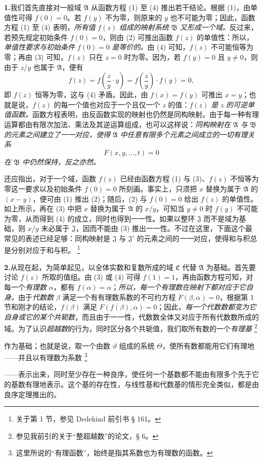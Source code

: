 \documentclass[11pt]{article}
\providecommand{\qtext}[1]{“#1”}
\providecommand{\Afield}{\mathfrak A}
\providecommand{\Bfield}{\mathfrak B}
\providecommand{\Cfield}{\mathfrak C}
\providecommand{\Jdom}{\mathfrak J}
\providecommand{\srcfn}[2]{%
  \begingroup\renewcommand{\thefootnote}{#1}\footnote{#2}\addtocounter{footnote}{-1}\endgroup}
\begin{document}
\medskip
\noindent\textbf{1.}\quad 我们首先直接对一般域 \(\Afield\) 从函数方程 (1) 至 (4) 推出若干结论。根据 (1)，由单值性可得 \(f(0)=0\)。若 \(f(y)\) 不为零，则原来的 \(y\) 也不可能为零；因此，函数方程 (1) 至 (4) 表明，\emph{所有值} \(f(z)\) \emph{组成的映射系统} \(\Bfield\) \emph{又形成一个域。}反过来，若预先规定初始条件 \(f(0)=0\)，则由 (2) 可推出函数 \(f(z)\) 的单值性：所以，\emph{单值性要求与初始条件} \(f(0)=0\) \emph{是等价的。}由 (4) 可知，\(f(z)\) 不可能恒等为零；再由 (3) 可知，\(f(z)\) 只在 \(z=0\) 时为零。因为，若 \(f(y)=0\) 且 \(y\ne0\)，则由于 \(z/y\) 也属于 \(\Afield\)，便有
\[
f(z)=f\!\left(\frac{z}{y}\cdot y\right)=f\!\left(\frac{z}{y}\right)\cdot f(y)=0,
\]
即 \(f(z)\) 恒等为零，这与 (4) 矛盾。因此，由 \(f(x)=f(y)\) 可推出 \(x=y\)；也就是说，\(f(z)\) 的每一个值也对应于一个且仅一个 \(z\) 的值：\emph{\(f(z)\) 是} \(z\) \emph{的可逆单值函数。}函数方程表明，由反函数实现的映射也仍然是同构映射。由于每一种有理运算都由有限次加法、乘法及其逆运算组成，也可以这样说：\emph{同构映射在} \(\Afield\) \emph{与} \(\Bfield\) \emph{的元素之间建立了一一对应，使得} \(\Afield\) \emph{中任意有限多个元素之间成立的一切有理关系}
\[
F(x,y,\ldots,t)=0
\]
\emph{在} \(\Bfield\) \emph{中仍然保持，反之亦然。}

还应指出，对于一个域，函数 \(f(z)\) 已经由函数方程 (1) 与 (3)、\(f(z)\) 不恒等为零这一要求以及初始条件 \(f(0)=0\) 所刻画。事实上，只须把 \(x\) 替换为属于 \(\Afield\) 的 \((x-y)\)，便可由 (1) 推出 (2)；随后，(2) 与 \(f(0)=0\) 给出 \(f(z)\) 的单值性。如上所示，再在 (3) 中把 \(x\) 替换为属于 \(\Afield\) 的 \(x/y\)，可知当 \(y\ne0\) 时 \(f(y)\) 不可能为零，从而得到 (4) 的成立，同时也得到一一性。如果以整环 \(\Jdom\) 而不是域为基础，则 \(x/y\) 未必属于 \(\Jdom\)，因而不能由 (3) 推出一一性。不过在这里，下面这个最常见的表述已经足够：同构映射是 \(\Jdom\) 与 \(\Jdom'\) 的元素之间的\emph{一一}对应，使得和与积总是分别对应于和与积。\srcfn{*)}{关于第 1 节，参见 Dedekind 前引书 § 161。}

\medskip
\noindent\textbf{2.}\quad 从现在起，为简单起见，以全体实数和复数所成的域 \(\Cfield\) 代替 \(\Afield\) 为基础。首先要讨论 \(f(z)\) 所取的值组。由 (3) 或 (4) 可得 \(f(1)=1\)，再由函数方程可知，对每一个\emph{有理数} \(\alpha\)，都有 \(f(\alpha)=\alpha\)；\emph{所以，每一个有理数在映射下都对应于它自身。}由于\emph{代数数} \(\beta\) 满足一个有有理数系数的不可约方程 \(F(\beta,\alpha)=0\)，根据第 1 节和刚才的结论，\(f(\beta)\) 满足 \(F(f(\beta),\alpha)=0\)；因此，\emph{每一个代数数都变为它自身或它的某个共轭数}，而且由于一一性，代数数全体又对应于所有代数数所成的域。为了认识\emph{超越数}的行为，同时区分各个共轭值，我们取所有数的一个\emph{有理基}\srcfn{**)}{参见我前引的关于\qtext{整超越数}的论文，§ 6。}作为基础；也就是说，取一个由数 \(\vartheta\) 组成的系统 \(\Theta\)，使所有数都能用它们有理地——并且以有理数为系数\srcfn{***)}{这里所说的\qtext{有理函数}，始终是指其系数也为有理数的函数。}——表示出来，同时至少存在一种良序，使任何一个基数都不能由有限多个先于它的基数有理地表示。这个基的存在性，与线性基和代数基的情形完全类似，都是由良序定理推出的。
\end{document}

